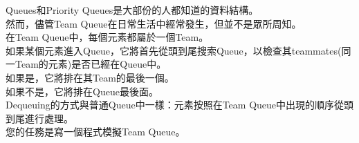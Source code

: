 Queues和Priority Queues是大部份的人都知道的資料結構。\\
然而，儘管Team Queue在日常生活中經常發生，但並不是眾所周知。\\
在Team Queue中，每個元素都屬於一個Team。\\
如果某個元素進入Queue，它將首先從頭到尾搜索Queue，以檢查其teammates(同一Team的元素)是否已經在Queue中。\\
如果是，它將排在其Team的最後一個。\\
如果不是，它將排在Queue最後面。\\
Dequeuing的方式與普通Queue中一樣：元素按照在Team Queue中出現的順序從頭到尾進行處理。\\
您的任務是寫一個程式模擬Team Queue。\\
